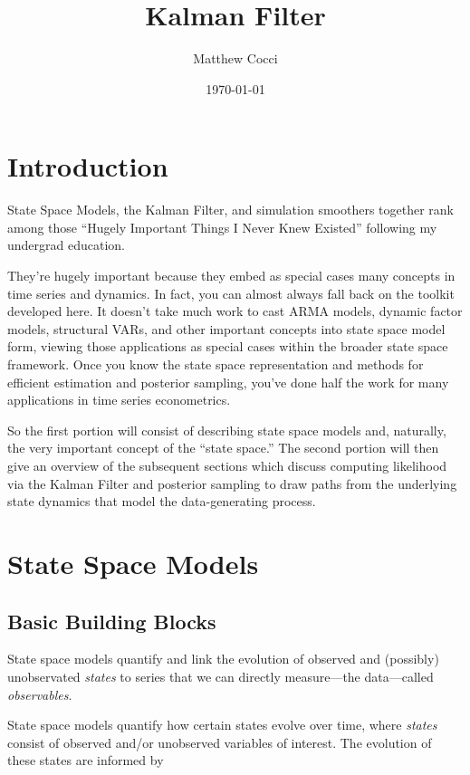 \documentclass[a4paper,12pt]{article}
\author{Matthew Cocci}
\title{Kalman Filter}
\date{\today}
\begin{document}
\maketitle


\section{Introduction}

State Space Models, the Kalman Filter, and simulation smoothers together
rank among those ``Hugely Important Things I Never Knew Existed''
following my undergrad education. 

They're hugely important because they embed as special cases many
concepts in time series and dynamics.  In fact, you can almost always
fall back on the toolkit developed here. It doesn't take much work to
cast ARMA models, dynamic factor models, structural VARs, and other
important concepts into state space model form, viewing those
applications as special cases within the broader state space framework.
Once you know the state space representation and methods for efficient
estimation and posterior sampling, you've done half the work for many
applications in time series econometrics.

So the first portion will consist of describing state space models and,
naturally, the very important concept of the ``state space.'' The second
portion will then give an overview of the subsequent sections which
discuss computing likelihood via the Kalman Filter and posterior
sampling to draw paths from the underlying state dynamics that 
model the data-generating process.


\section{State Space Models}

\subsection{Basic Building Blocks}

State space models quantify and link the evolution of observed and
(possibly) unobservated \emph{states} to series that we can directly
measure---the data---called \emph{observables}. 

State space models quantify how certain states evolve over time, where
\emph{states} consist of observed and/or unobserved variables of
interest. The evolution of these states are informed by  
\end{document}
